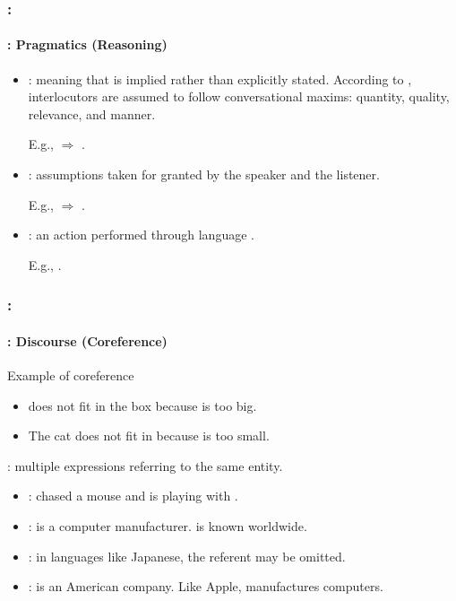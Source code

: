\documentclass[xcolor=table]{beamer}
\begin{document}
\begin{frame}
	\frametitle{\insertshortsubtitle: \insertsection}
	\framesubtitle{\insertsubsection: Pragmatics (Reasoning)}
	
	\begin{itemize}
		\item {}: meaning that is implied rather than explicitly stated.
		According to \cite{1979-Grice}, interlocutors are assumed to follow conversational maxims: quantity, quality, relevance, and manner.
		
		E.g.,  $\Rightarrow$ .
		
		\item {}: assumptions taken for granted by the speaker and the listener.
		
		E.g.,  $\Rightarrow$ .
		
		\item {}: an action performed through language \cite{1962-austin}.
		
		E.g., .
	\end{itemize}
	
\end{frame}

\begin{frame}
	\frametitle{\insertshortsubtitle: \insertsection}
	\framesubtitle{\insertsubsection: Discourse (Coreference)}
	
	\begin{exampleblock}{Example of coreference}
		\begin{itemize}
			\item {} does not fit in the box because  is too big.
			\item The cat does not fit in  because  is too small.
		\end{itemize}
	\end{exampleblock}
	
	: multiple expressions referring to the same entity.
	\begin{itemize}
		\item {}:  chased a mouse and  is playing with .
		
		\item {}:  is a computer manufacturer.  is known worldwide.
		
		\item {}: in languages like Japanese, the referent may be omitted.
		
		\item {}:  is an American company. Like Apple,  manufactures computers.
	\end{itemize}
	
\end{frame}
\end{document}
